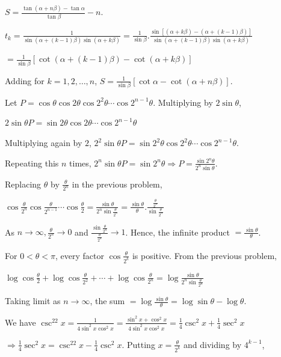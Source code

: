   $S = \frac{\tan(\alpha + n\beta) - \tan\alpha}{\tan\beta} - n$.
\item $t_k = \frac{1}{\sin(\alpha + (k - 1)\beta)\sin(\alpha + k\beta)} = \frac{1}{\sin\beta}.\frac{\sin[(\alpha
    + k\beta) - (\alpha + (k - 1)\beta)]}{\sin(\alpha + (k - 1)\beta)\sin(\alpha + k\beta)}$

  $= \frac{1}{\sin\beta}[\cot(\alpha + (k - 1)\beta) - \cot(\alpha + k\beta)]$

  Adding for $k = 1, 2, \ldots, n$, $S = \frac{1}{\sin\beta}[\cot\alpha - \cot(\alpha + n\beta)]$.
\item Let $P = \cos\theta\cos2\theta\cos2^2\theta\cdots\cos2^{n - 1}\theta$. Multiplying by $2\sin\theta$,

  $2\sin\theta P = \sin2\theta\cos2\theta\cdots\cos2^{n - 1}\theta$

  Multiplying again by $2$, $2^2\sin\theta P = \sin2^2\theta\cos2^2\theta\cdots\cos2^{n - 1}\theta$.

  Repeating this $n$ times, $2^n\sin\theta P = \sin2^n\theta \Rightarrow P =
  \frac{\sin2^n\theta}{2^n\sin\theta}$.
\item Replacing $\theta$ by $\frac{\theta}{2^n}$ in the previous problem,

  $\cos\frac{\theta}{2^n}\cos\frac{\theta}{2^{n - 1}}\cdots\cos\frac{\theta}{2} =
  \frac{\sin\theta}{2^n\sin\frac{\theta}{2^n}} = \frac{\sin\theta}{\theta}.\frac{\frac{\theta}{2^n}}{\sin\frac{\theta}{2^n}}$

  As $n \to \infty, \frac{\theta}{2^n} \to 0$ and $\frac{\sin\frac{\theta}{2^n}}{\frac{\theta}{2^n}} \to 1$.
  Hence, the infinite product $= \frac{\sin\theta}{\theta}$.
\item For $0 < \theta < \pi$, every factor $\cos\frac{\theta}{2^k}$ is positive. From the previous problem,

  $\log\cos\frac{\theta}{2} + \log\cos\frac{\theta}{2^2} + \cdots + \log\cos\frac{\theta}{2^n} =
  \log\frac{\sin\theta}{2^n\sin\frac{\theta}{2^n}}$

  Taking limit as $n \to \infty$, the sum $= \log\frac{\sin\theta}{\theta} = \log\sin\theta - \log\theta$.
\item We have $\csc^22x = \frac{1}{4\sin^2x\cos^2x} = \frac{\sin^2x + \cos^2x}{4\sin^2x\cos^2x} =
  \frac{1}{4}\csc^2x + \frac{1}{4}\sec^2x$

  $\Rightarrow \frac{1}{4}\sec^2x = \csc^22x - \frac{1}{4}\csc^2x$. Putting $x = \frac{\theta}{2^k}$ and
  dividing by $4^{k - 1}$,

